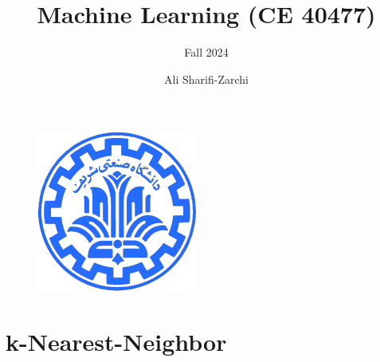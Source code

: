 \documentclass[serif, aspectratio=169]{beamer}
\author{Ali Sharifi-Zarchi}
\title{Machine Learning (CE 40477)}
\subtitle{Fall 2024}
\institute{
    CE Department \\
    Sharif University of Technology
}
\begin{document}
\begin{frame}
    \titlepage
    \vspace*{-0.6cm}
    \begin{figure}[htpb]
        \begin{center}
            \includegraphics[keepaspectratio, scale=0.25]{pic/sharif-main-logo.png}
        \end{center}
    \end{figure}
\end{frame}

\begin{frame}    
\tableofcontents[sectionstyle=show,
subsectionstyle=show/shaded/hide,
subsubsectionstyle=show/shaded/hide]
\end{frame}



\section{k-Nearest-Neighbor}
\end{document}
